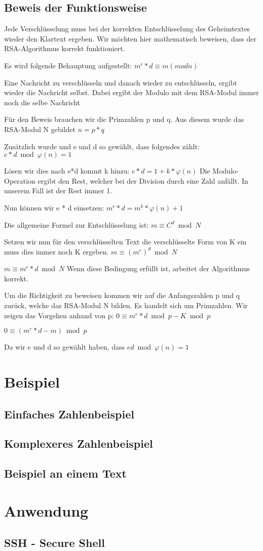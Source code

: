 \subsection{Beweis der Funktionsweise}
Jede Verschlüsselung muss bei der korrekten Entschlüsselung des Geheimtextes wieder den Klartext ergeben. Wir möchten hier mathematisch beweisen, dass der RSA-Algorithmus korrekt funktioniert.

Es wird folgende Behauptung aufgestellt:
$ m^e*d \equiv m (mod n) $

Eine Nachricht zu verschlüsseln und danach wieder zu entschlüsseln, ergibt wieder die Nachricht selbst. Dabei ergibt der Modulo mit dem RSA-Modul immer noch die selbe Nachricht

Für den Beweis brauchen wir die Primzahlen p und q. Aus diesem wurde das RSA-Modul N gebildet
$ n = p * q $

Zusätzlich wurde und e und d so gewählt, dass folgendes zählt:
$ e * d \bmod \varphi(n) = 1 $

Lösen wir dies nach e*d kommt k hinzu:
$ e * d = 1 + k * \varphi(n) $
Die Modulo-Operation ergibt den Rest, welcher bei der Division durch eine Zahl anfällt. In unserem Fall ist der Rest immer 1.

Nun können wir e * d einsetzen:
$ m^e*d = m^k*\varphi(n)+1 $


Die allgemeine Formel zur Entschlüsselung ist:
$ m \equiv C^d \bmod N $

Setzen wir nun für den verschlüsselten Text die verschlüsselte Form von K ein muss dies immer noch K ergeben.
$ m \equiv (m^e)^d \bmod N $

$ m \equiv m^e*d \bmod N $
Wenn diese Bedingung erfüllt ist, arbeitet der Algorithmus korrekt.

Um die Richtigkeit zu beweisen kommen wir auf die Anfangszahlen p und q zurück, welche das RSA-Modul N bilden. Es handelt sich um Primzahlen. Wir zeigen das Vorgehen anhand von p:
$ 0 \equiv m^e*d \bmod p - K \bmod p $

$ 0 \equiv (m^e*d-m) \bmod p $

Da wir e und d so gewählt haben, dass 
$ ed \bmod \varphi(n) = 1 $ 


\section{Beispiel}
\subsection{Einfaches Zahlenbeispiel}
\subsection{Komplexeres Zahlenbeispiel}
\subsection{Beispiel an einem Text}
\section{Anwendung}
\subsection{SSH - Secure Shell}
